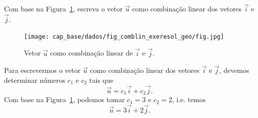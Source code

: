 \begin{exeresol}\label{exeresol:comblin_geo}
  Com base na Figura~\ref{cap_base_sec_comblin:fig:comblin_exeresol_geo}, escreva o vetor $\vec{u}$ como combinação linear dos vetores $\vec{i}$ e $\vec{j}$.

  \begin{figure}[H]
    \centering
    \texttt{[image: cap\_base/dados/fig\_comblin\_exeresol\_geo/fig.jpg]}
    \caption{Vetor $\vec{u}$ como combinação linear de $\vec{i}$ e $\vec{j}$.}
    \label{cap_base_sec_comblin:fig:comblin_exeresol_geo}
  \end{figure}

\end{exeresol}
\begin{resol}
  Para escrevermos o vetor $\vec{u}$ como combinação linear dos vetores $\vec{i}$ e $\vec{j}$, devemos determinar números $c_1$ e $c_2$ tais que
  \begin{equation}
    \vec{u} = c_1\vec{i} + c_2\vec{j}.
  \end{equation}
  Com base na Figura~\ref{cap_base_sec_comblin:fig:comblin_exeresol_geo}, podemos tomar $c_1 = 3$ e $c_2=2$, i.e. temos
  \begin{equation}
    \vec{u} = 3\vec{i} + 2\vec{j}.
  \end{equation}
\end{resol}

